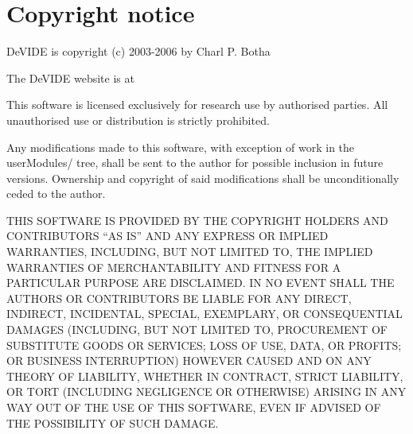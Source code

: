 
%
%
\newcommand{\commandref}[2]{\helpref{{\tt $\backslash$#1}}{#2}}%
\newcommand{\commandrefn}[2]{\helprefn{{\tt $\backslash$#1}}{#2}\index{#1}}%
\newcommand{\commandpageref}[2]{\latexignore{\helprefn{{\tt $\backslash$#1}}{#2}}\latexonly{{\tt $\backslash$#1} {\it page \pageref{#2}}}\index{#1}}%
\newcommand{\indexit}[1]{#1\index{#1}}%
\newcommand{\inioption}[1]{{\bf {\tt #1}}\index{#1}}%
\parskip=10pt%
\parindent=0pt%
%
%
\makeindex%
%
\maketitle%
\pagestyle{fancyplain}%
%
%
%
\setfooter{\thepage}{}{}{}{}{\thepage}%
\tableofcontents%

\chapter*{Copyright notice}%
%
\setfooter{\thepage}{}{}{}{}{\thepage}%
DeVIDE is copyright (c) 2003-2006 by Charl P. Botha

The DeVIDE website is at

This software is licensed exclusively for research use by authorised
parties.  All unauthorised use or distribution is strictly prohibited.

Any modifications made to this software, with exception of work in the
userModules/ tree, shall be sent to the author for possible inclusion
in future versions.  Ownership and copyright of said modifications
shall be unconditionally ceded to the author.

THIS SOFTWARE IS PROVIDED BY THE COPYRIGHT HOLDERS AND CONTRIBUTORS
``AS IS'' AND ANY EXPRESS OR IMPLIED WARRANTIES, INCLUDING, BUT NOT
LIMITED TO, THE IMPLIED WARRANTIES OF MERCHANTABILITY AND FITNESS FOR
A PARTICULAR PURPOSE ARE DISCLAIMED.  IN NO EVENT SHALL THE AUTHORS OR
CONTRIBUTORS BE LIABLE FOR ANY DIRECT, INDIRECT, INCIDENTAL, SPECIAL,
EXEMPLARY, OR CONSEQUENTIAL DAMAGES (INCLUDING, BUT NOT LIMITED TO,
PROCUREMENT OF SUBSTITUTE GOODS OR SERVICES; LOSS OF USE, DATA, OR
PROFITS; OR BUSINESS INTERRUPTION) HOWEVER CAUSED AND ON ANY THEORY OF
LIABILITY, WHETHER IN CONTRACT, STRICT LIABILITY, OR TORT (INCLUDING
NEGLIGENCE OR OTHERWISE) ARISING IN ANY WAY OUT OF THE USE OF THIS
SOFTWARE, EVEN IF ADVISED OF THE POSSIBILITY OF SUCH DAMAGE.

